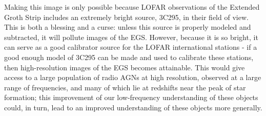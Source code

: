 \pg
Making this image is only possible because LOFAR observations of the Extended Groth Strip includes an extremely bright source, 3C295, in their field of view. This is both a blessing and a curse: unless this source is properly modeled and subtracted, it will pollute images of the EGS. However, because it is so bright, it can serve as a good calibrator source for the LOFAR international stations - if a good enough model of 3C295 can be made and used to calibrate these stations, then high-resolution images of the EGS becomes attainable. This would give access to a large population of radio AGNs at high resolution, observed at a large range of frequencies, and many of which lie at redshifts near the peak of star formation; this improvement of our low-frequency understanding of these objects could, in turn, lead to an improved understanding of these objects more generally.


